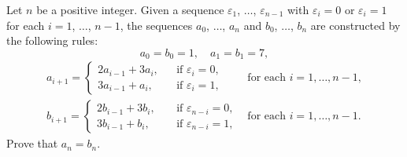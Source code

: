 Let $n$ be a positive integer.  Given a sequence $\varepsilon_1$,  $\dots$,  $\varepsilon_{n - 1}$ with $\varepsilon_i = 0$ or $\varepsilon_i = 1$ for each $i = 1$,  $\dots$,  $n - 1$,  the sequences $a_0$,  $\dots$,  $a_n$ and $b_0$,  $\dots$,  $b_n$ are constructed by the following rules: \[a_0 = b_0 = 1, \quad a_1 = b_1 = 7,\] \[\begin{array}{lll}

	a_{i+1} = 

	\begin{cases}

		2a_{i-1} + 3a_i, \\

		3a_{i-1} + a_i, 

	\end{cases} & 

        \begin{array}{l} 

                \text{if } \varepsilon_i = 0, \\  

                \text{if } \varepsilon_i = 1, \end{array} 

         & \text{for each } i = 1, \dots, n - 1, \\[15pt]

        b_{i+1}= 

        \begin{cases}

		2b_{i-1} + 3b_i, \\

		3b_{i-1} + b_i, 

	\end{cases} & 

        \begin{array}{l} 

                \text{if } \varepsilon_{n-i} = 0, \\  

                \text{if } \varepsilon_{n-i} = 1, \end{array} 

         & \text{for each } i = 1, \dots, n - 1.

	\end{array}\]  Prove that $a_n = b_n$.
